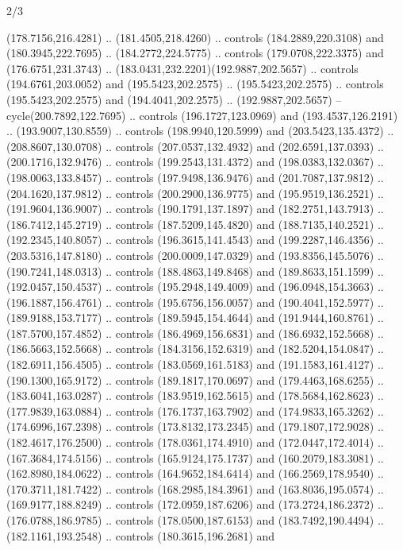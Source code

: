 \begin{flagdescription}{2/3}
\begin{scope}[xshift=0.5\flaglength,yshift=0.5\flagwidth,scale=\flagwidth/525.28]
\begin{scope}[y=0.1mm, x=0.1mm, yscale=-1,shift={(-381.5,-404)}]
  (178.7156,216.4281) .. (181.4505,218.4260) .. controls (184.2889,220.3108) and
  (180.3945,222.7695) .. (184.2772,224.5775) .. controls (179.0708,222.3375) and
  (176.6751,231.3743) .. (183.0431,232.2201)(192.9887,202.5657) .. controls
  (194.6761,203.0052) and (195.5423,202.2575) .. (195.5423,202.2575) .. controls
  (195.5423,202.2575) and (194.4041,202.2575) .. (192.9887,202.5657) --
  cycle(200.7892,122.7695) .. controls (196.1727,123.0969) and
  (193.4537,126.2191) .. (193.9007,130.8559) .. controls (198.9940,120.5999) and
  (203.5423,135.4372) .. (208.8607,130.0708) .. controls (207.0537,132.4932) and
  (202.6591,137.0393) .. (200.1716,132.9476) .. controls (199.2543,131.4372) and
  (198.0383,132.0367) .. (198.0063,133.8457) .. controls (197.9498,136.9476) and
  (201.7087,137.9812) .. (204.1620,137.9812) .. controls (200.2900,136.9775) and
  (195.9519,136.2521) .. (191.9604,136.9007) .. controls (190.1791,137.1897) and
  (182.2751,143.7913) .. (186.7412,145.2719) .. controls (187.5209,145.4820) and
  (188.7135,140.2521) .. (192.2345,140.8057) .. controls (196.3615,141.4543) and
  (199.2287,146.4356) .. (203.5316,147.8180) .. controls (200.0009,147.0329) and
  (193.8356,145.5076) .. (190.7241,148.0313) .. controls (188.4863,149.8468) and
  (189.8633,151.1599) .. (192.0457,150.4537) .. controls (195.2948,149.4009) and
  (196.0948,154.3663) .. (196.1887,156.4761) .. controls (195.6756,156.0057) and
  (190.4041,152.5977) .. (189.9188,153.7177) .. controls (189.5945,154.4644) and
  (191.9444,160.8761) .. (187.5700,157.4852) .. controls (186.4969,156.6831) and
  (186.6932,152.5668) .. (186.5663,152.5668) .. controls (184.3156,152.6319) and
  (182.5204,154.0847) .. (182.6911,156.4505) .. controls (183.0569,161.5183) and
  (191.1583,161.4127) .. (190.1300,165.9172) .. controls (189.1817,170.0697) and
  (179.4463,168.6255) .. (183.6041,163.0287) .. controls (183.9519,162.5615) and
  (178.5684,162.8623) .. (177.9839,163.0884) .. controls (176.1737,163.7902) and
  (174.9833,165.3262) .. (174.6996,167.2398) .. controls (173.8132,173.2345) and
  (179.1807,172.9028) .. (182.4617,176.2500) .. controls (178.0361,174.4910) and
  (172.0447,172.4014) .. (167.3684,174.5156) .. controls (165.9124,175.1737) and
  (160.2079,183.3081) .. (162.8980,184.0622) .. controls (164.9652,184.6414) and
  (166.2569,178.9540) .. (170.3711,181.7422) .. controls (168.2985,184.3961) and
  (163.8036,195.0574) .. (169.9177,188.8249) .. controls (172.0959,187.6206) and
  (173.2724,186.2372) .. (176.0788,186.9785) .. controls (178.0500,187.6153) and
  (183.7492,190.4494) .. (182.1161,193.2548) .. controls (180.3615,196.2681) and

\end{scope}
\end{scope}
\end{flagdescription}
